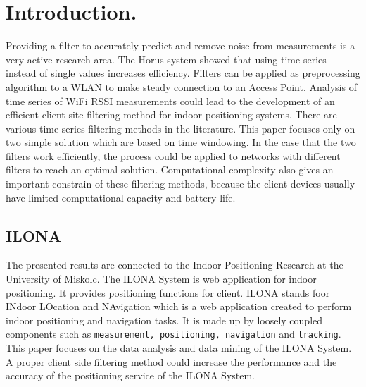 \chapter{Introduction.}
\label{chap:introduction}

Providing a filter to accurately predict and remove noise from measurements is a very active research area.
The Horus system showed that using time series instead of single values increases efficiency.
Filters can be applied as preprocessing algorithm to a WLAN to make steady connection to an Access Point.
Analysis of time series of WiFi RSSI measurements could lead to the development of an efficient client site filtering method for indoor positioning systems.
There are various time series filtering methods in the literature. This paper focuses only on two simple solution which are based on time windowing.
In the case that the two filters work efficiently, the process could be applied to networks with different filters to reach an optimal solution.
Computational complexity also gives an important constrain of these filtering methods, because the client devices usually have limited computational capacity and battery life.

\section{ILONA}
The presented results are connected to the Indoor Positioning Research at the University of Miskolc. The ILONA System is web application for indoor positioning. It provides positioning functions for client. 
ILONA stands foor  INdoor LOcation and NAvigation which is a web application
created to perform indoor positioning and navigation tasks.
It is made up by loosely coupled components such as \texttt{measurement, positioning, navigation} and \texttt{tracking}.
This paper focuses on the data analysis and data mining of the ILONA System.
A proper client side filtering method could increase the performance and the accuracy of the positioning service of the ILONA System.

